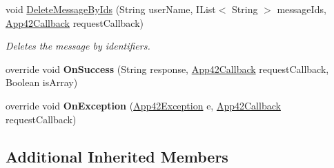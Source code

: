 \begin{DoxyCompactItemize}
void \hyperlink{classcom_1_1shephertz_1_1app42_1_1paas_1_1sdk_1_1windows_1_1buddy_1_1_buddy_service_a4bc978b659a472c5a1db11ea081ea172}{Delete\+Message\+By\+Ids} (String user\+Name, I\+List$<$ String $>$ message\+Ids, \hyperlink{interfacecom_1_1shephertz_1_1app42_1_1paas_1_1sdk_1_1windows_1_1_app42_callback}{App42\+Callback} request\+Callback)
\begin{DoxyCompactList}\small\item\em Deletes the message by identifiers. \end{DoxyCompactList}\item 
\hypertarget{classcom_1_1shephertz_1_1app42_1_1paas_1_1sdk_1_1windows_1_1buddy_1_1_buddy_service_a7c498113b38c3524b4ac0175baf88582}{override void {\bfseries On\+Success} (String response, \hyperlink{interfacecom_1_1shephertz_1_1app42_1_1paas_1_1sdk_1_1windows_1_1_app42_callback}{App42\+Callback} request\+Callback, Boolean is\+Array)}\label{classcom_1_1shephertz_1_1app42_1_1paas_1_1sdk_1_1windows_1_1buddy_1_1_buddy_service_a7c498113b38c3524b4ac0175baf88582}

\item 
\hypertarget{classcom_1_1shephertz_1_1app42_1_1paas_1_1sdk_1_1windows_1_1buddy_1_1_buddy_service_a5f361109713e7c4d3a834651b4b7ed0c}{override void {\bfseries On\+Exception} (\hyperlink{classcom_1_1shephertz_1_1app42_1_1paas_1_1sdk_1_1windows_1_1_app42_exception}{App42\+Exception} e, \hyperlink{interfacecom_1_1shephertz_1_1app42_1_1paas_1_1sdk_1_1windows_1_1_app42_callback}{App42\+Callback} request\+Callback)}\label{classcom_1_1shephertz_1_1app42_1_1paas_1_1sdk_1_1windows_1_1buddy_1_1_buddy_service_a5f361109713e7c4d3a834651b4b7ed0c}

\end{DoxyCompactItemize}
\subsection*{Additional Inherited Members}


